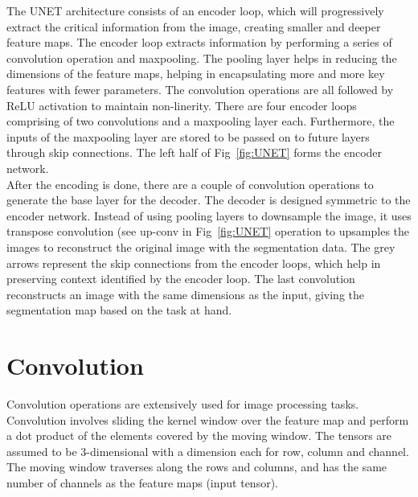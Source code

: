 \documentclass[a4paper,12pt, final]{report}
\begin{document}
The UNET architecture consists of an encoder loop, which will progressively extract the critical information from the image, creating smaller and deeper feature maps. The encoder loop extracts information by performing a series of convolution operation and maxpooling. The pooling layer helps in reducing the dimensions of the feature maps, helping in encapsulating more and more key features with fewer parameters. The convolution operations are all followed by ReLU activation to maintain non-linerity. There are four encoder loops comprising of two convolutions and a maxpooling layer each. Furthermore, the inputs of the maxpooling layer are stored to be passed on to future layers through skip connections. The left half of Fig~\ref{fig:UNET} forms the encoder network.
\\

After the encoding is done, there are a couple of convolution operations to generate the base layer for the decoder. The decoder is designed symmetric to the encoder network. Instead of using pooling layers to downsample the image, it uses transpose convolution (see up-conv in  Fig~\ref{fig:UNET} operation to upsamples the images to reconstruct the original image with the segmentation data. The grey arrows represent the skip connections from the encoder loops, which help in preserving context identified by the encoder loop. The last convolution reconstructs an image with the same dimensions as the input, giving the segmentation map based on the task at hand.
\\


\section{Convolution}

Convolution operations are extensively used for image processing tasks. Convolution involves sliding the kernel window over the feature map and perform a dot product of the elements covered by the moving window. The tensors are assumed to be 3-dimensional with a dimension each for row, column and channel. The moving window traverses along the rows and columns, and has the same number of channels as the feature maps (input tensor).
\\
\end{document}

